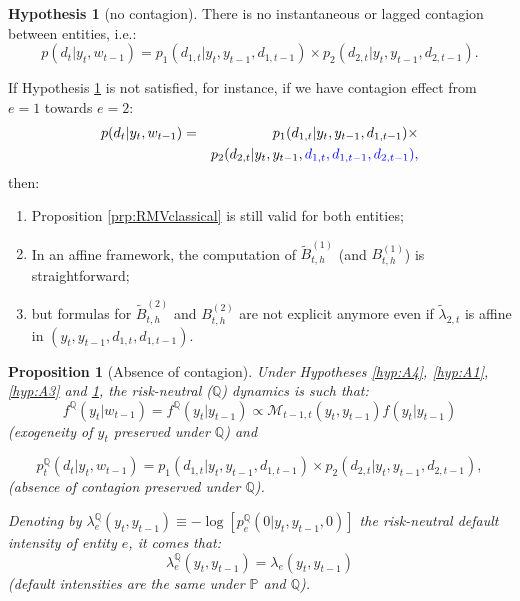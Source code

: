 \documentclass[
  12pt,
]{book}
\providecommand{\tightlist}{%
  \setlength{\itemsep}{0pt}\setlength{\parskip}{0pt}}
\newtheorem{proposition}{Proposition}[chapter]
\theoremstyle{definition}
\theoremstyle{definition}
\theoremstyle{definition}
\theoremstyle{definition}
\newtheorem{hypothesis}{Hypothesis}[chapter]
\theoremstyle{remark}
\begin{document}
\begin{hypothesis}[no contagion]
\protect\hypertarget{hyp:A2}{}\label{hyp:A2}There is no instantaneous or lagged contagion between entities, i.e.:
\begin{equation*}
p ( d_t  |  y_t, w_{t-1} ) = p_1 ( d_{1, t}  |  y_t, y_{t-1}, d_{1, t-1})   \times   p_2 ( d_{2, t}  |  y_t, y_{t-1}, d_{2, t-1}) .
\end{equation*}
\end{hypothesis}

If Hypothesis \ref{hyp:A2} is not satisfied, for instance, if we have contagion effect from \(e = 1\) towards \(e = 2\):
\begin{eqnarray*}
p(d_t|y_t, w_{t-1} ) &=& p_1 ( d_{1, t}  |  y_t, y_{t-1}, d_{1, t-1}) \times \\
&&  p_2 ( d_{2, t}  |  y_t, y_{t-1}, \color{blue}{d_{1, t}}, \color{blue}{d_{1, t-1}}, d_{2, t-1}),
\end{eqnarray*}
then:

\begin{enumerate}
\def\labelenumi{\arabic{enumi}.}
\tightlist
\item
  Proposition \ref{prp:RMVclassical} is still valid for both entities;
\item
  In an affine framework, the computation of \(\widetilde{B}^{(1)}_{t,h}\) (and \(B^{(1)}_{t,h}\)) is straightforward;
\item
  but formulas for \(\widetilde{B}^{(2)}_{t,h}\) and \(B^{(2)}_{t,h}\) are not explicit anymore even if \(\widetilde{\lambda}_{2, t}\) is affine in \((y_t, y_{t-1}, d_{1, t}, d_{1, t-1})\).
\end{enumerate}

\begin{proposition}[Absence of contagion]
\protect\hypertarget{prp:defBondAffine}{}\label{prp:defBondAffine}Under Hypotheses \ref{hyp:A4}, \ref{hyp:A1}, \ref{hyp:A3} and \ref{hyp:A2}, the risk-neutral (\(\mathbb{Q}\)) dynamics is such that:
\[
f^{\mathbb{Q}} ( y_t  |  w_{t-1}) = f^{\mathbb{Q}} ( y_t  |  y_{t-1}) \propto \mathcal{M}_{t-1, t}( y_t, y_{t-1}) f (y_t  |  y_{t-1})
\]
(\emph{exogeneity of \(y_t\) preserved under \(\mathbb{Q}\)}) and

\[
p_t^{\mathbb{Q}} ( d_{t}  |  y_t, w_{t-1} ) = p_1 ( d_{1, t}  |  y_t, y_{t-1}, d_{1, t-1} )   \times   p_2 ( d_{2, t}  |  y_t, y_{t-1}, d_{2, t-1}),
\]
(\emph{absence of contagion preserved under \(\mathbb{Q}\)}).

Denoting by \(\lambda^{\mathbb{Q}}_e \left( y_t, y_{t-1} \right) \equiv - \log \left[ p_e^{\mathbb{Q}} ( 0 | y_t, y_{t-1}, 0 ) \right]\) the \emph{risk-neutral default intensity} of entity
\(e\), it comes that:
\[
\lambda^{\mathbb{Q}}_e \left( y_t, y_{t-1} \right) = \lambda_e \left( y_t, y_{t-1} \right)
\]
(\emph{default intensities are the same under \(\mathbb{P}\) and \(\mathbb{Q}\)}).
\end{proposition}
\end{document}
